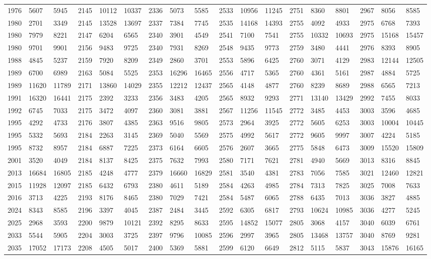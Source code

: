 \begin{center}
\begin{longtable}{*5{A@{\hspace*{5mm}}A}}
1976&5607&5945&2145&10112&10337&2336&5073&5585&2533&10956&11245&2751&8360&8801&2967&8056&8585\\
1980&2701&3349&2145&13528&13697&2337&7384&7745&2535&14168&14393&2755&4092&4933&2975&6768&7393\\
1980&7979&8221&2147&6204&6565&2340&3901&4549&2541&7100&7541&2755&10332&10693&2975&15168&15457\\
1980&9701&9901&2156&9483&9725&2340&7931&8269&2548&9435&9773&2759&3480&4441&2976&8393&8905\\
1988&4845&5237&2159&7920&8209&2349&2860&3701&2553&5896&6425&2760&3071&4129&2983&12144&12505\\
1989&6700&6989&2163&5084&5525&2353&16296&16465&2556&4717&5365&2760&4361&5161&2987&4884&5725\\
1989&11620&11789&2171&13860&14029&2355&12212&12437&2565&4148&4877&2760&8239&8689&2988&6565&7213\\
1991&16320&16441&2175&2392&3233&2356&3483&4205&2565&8932&9293&2771&13140&13429&2992&7455&8033\\
1992&6745&7033&2175&3472&4097&2360&3081&3881&2567&11256&11545&2772&3485&4453&3003&3596&4685\\
1995&4292&4733&2176&3807&4385&2363&9516&9805&2573&2964&3925&2772&5605&6253&3003&10004&10445\\
1995&5332&5693&2184&2263&3145&2369&5040&5569&2575&4992&5617&2772&9605&9997&3007&4224&5185\\
1995&8732&8957&2184&6887&7225&2373&6164&6605&2576&2607&3665&2775&5848&6473&3009&15520&15809\\
2001&3520&4049&2184&8137&8425&2375&7632&7993&2580&7171&7621&2781&4940&5669&3013&8316&8845\\
2013&16684&16805&2185&4248&4777&2379&16660&16829&2581&3540&4381&2783&7056&7585&3021&12460&12821\\
2015&11928&12097&2185&6432&6793&2380&4611&5189&2584&4263&4985&2784&7313&7825&3025&7008&7633\\
2016&3713&4225&2193&8176&8465&2380&7029&7421&2584&5487&6065&2788&6435&7013&3036&3827&4885\\
2024&8343&8585&2196&3397&4045&2387&2484&3445&2592&6305&6817&2793&10624&10985&3036&4277&5245\\
2025&2968&3593&2200&9879&10121&2392&8295&8633&2595&14852&15077&2805&3068&4157&3040&6039&6761\\
2033&5544&5905&2204&3003&3725&2397&9796&10085&2596&2997&3965&2805&13468&13757&3040&8769&9281\\
2035&17052&17173&2208&4505&5017&2400&5369&5881&2599&6120&6649&2812&5115&5837&3043&15876&16165\\

\end{longtable}
\end{center}
